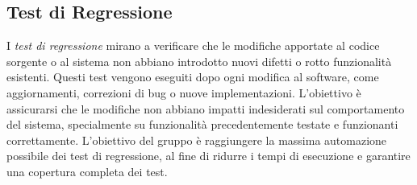 \documentclass{article}
\begin{document}
\subsection{Test di Regressione}
I \textit{test di regressione} mirano a verificare che le modifiche apportate al codice sorgente o al sistema non abbiano introdotto nuovi difetti o rotto funzionalità esistenti. Questi test vengono eseguiti dopo ogni modifica al software, come aggiornamenti, correzioni di bug o nuove implementazioni. L'obiettivo è assicurarsi che le modifiche non abbiano impatti indesiderati sul comportamento del sistema, specialmente su funzionalità precedentemente testate e funzionanti correttamente. L'obiettivo del gruppo è raggiungere la massima automazione possibile dei test di regressione, al fine di ridurre i tempi di esecuzione e garantire una copertura completa dei test.
\end{document}
